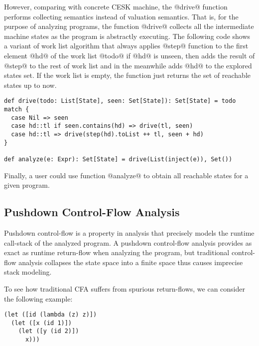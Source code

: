 \documentclass[acmsmall,review,anonymous]{acmart}\settopmatter{printfolios=true,printccs=false,printacmref=false}
\begin{document}
However, comparing with concrete CESK machine, the
@drive@ function performs collecting semantics instead of valuation
semantics. That is, for the purpose of analyzing programs, the function @drive@
collects all the intermediate machine states as the program is abstractly executing.
The following code shows a variant of work list algorithm that always applies @step@
function to the first element @hd@ of the work list @todo@ if @hd@
is unseen, then adds the result of @step@ to the rest of work list and in 
the meanwhile adds @hd@ to the explored states set.
If the work list is empty, the function just returns the set of reachable states up to now.

\begin{lstlisting}
def drive(todo: List[State], seen: Set[State]): Set[State] = todo match {
  case Nil => seen
  case hd::tl if seen.contains(hd) => drive(tl, seen)
  case hd::tl => drive(step(hd).toList ++ tl, seen + hd)
}

def analyze(e: Expr): Set[State] = drive(List(inject(e)), Set())
\end{lstlisting}

Finally, a user could use function @analyze@ to obtain all reachable states 
for a given program.


\subsection{Pushdown Control-Flow Analysis}

Pushdown control-flow is a property in analysis that precisely models
the runtime call-stack of the analyzed program. 
A pushdown control-flow analysis provides as exact as runtime return-flow 
when analyzing the program, but traditional control-flow analysis collapses 
the state space into a finite space thus causes imprecise stack modeling.

To see how traditional CFA suffers from spurious return-flows, 
we can consider the following example:

\begin{lstlisting}
(let ([id (lambda (z) z)])
  (let ([x (id 1)])
    (let ([y (id 2)])
      x)))
\end{lstlisting}
\end{document}
